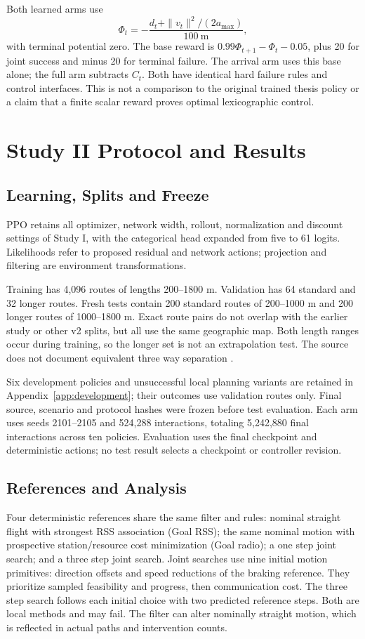 \documentclass[conference]{IEEEtran}
\begin{document}
Both learned arms use
\begin{equation}
\Phi_t=-\frac{d_t+\|v_t\|^2/(2a_{\max})}{100\ \mathrm{m}},
\end{equation}
with terminal potential zero. The base reward is $0.99\Phi_{t+1}-\Phi_t-0.05$,
plus 20 for joint success and minus 20 for terminal failure. The arrival arm
uses this base alone; the full arm subtracts $C_t$. Both have identical hard
failure rules and control interfaces. This is not a comparison to the original
trained thesis policy or a claim that a finite scalar reward proves optimal
lexicographic control.

\section{Study II Protocol and Results}
\label{sec:study2}
\subsection{Learning, Splits and Freeze}
PPO retains all optimizer, network width, rollout, normalization and discount
settings of Study I, with the categorical head expanded from five to 61 logits. Likelihoods refer to proposed residual
and network actions; projection and filtering are environment transformations.

Training has 4,096 routes of lengths 200--1800 m. Validation has 64 standard and
32 longer routes. Fresh tests contain 200 standard routes of 200--1000 m and
200 longer routes of 1000--1800 m. Exact route pairs do not overlap with the
earlier study or other v2 splits, but all use the same geographic map. Both
length ranges occur during training, so the longer set is not an extrapolation
test. The source does not document equivalent three way separation
\cite[pp.~15--16, Secs.~6.2--6.3]{thesis}.

Six development policies and unsuccessful local planning variants are retained
in Appendix~\ref{app:development}; their outcomes use validation routes only.
Final source, scenario and protocol hashes were frozen before test evaluation.
Each arm uses seeds 2101--2105 and 524,288 interactions, totaling 5,242,880 final
interactions across ten policies. Evaluation uses the final checkpoint and
deterministic actions; no test result selects a checkpoint or controller revision.

\subsection{References and Analysis}
Four deterministic references share the same filter and rules: nominal straight
flight with strongest RSS association (Goal RSS); the same nominal motion with
prospective station/resource cost minimization (Goal radio); a one step joint
search; and a three step joint search. Joint searches use nine initial motion
primitives: direction offsets and speed reductions of the braking reference.
They prioritize sampled feasibility and progress, then communication cost.
The three step search follows each initial choice with two predicted reference
steps. Both are local methods and may fail. The filter can alter nominally
straight motion, which is reflected in actual paths and intervention counts.
\end{document}
